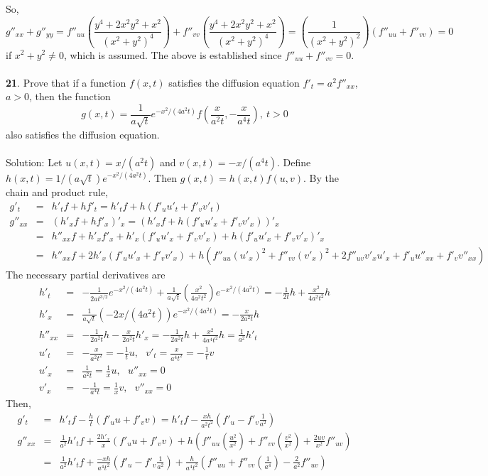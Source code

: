 \documentclass[12pt]{amsbook}
\begin{document}
So,
$$g''_{xx}+g''_{yy}=f''_{uu}(\frac{y^4+2x^2y^2+x^2}{(x^2+y^2)^4})+f''_{vv}(\frac{y^4+2x^2y^2+x^2}{(x^2+y^2)^4})=(\frac{1}{(x^2+y^2)^2})(f''_{uu}+f''_{vv})=0$$
if $x^2+y^2 \neq 0$, which is assumed. The above is established since $f''_{uu}+f''_{vv}=0$. 
\\
\\
{\small\bf 21}. Prove that if a function $f(x, t)$ satisfies the diffusion equation $f'_t=a^2f''_{xx}$,
$a > 0$, then the function
$$g(x,t)=\frac{1}{a\sqrt{t}}e^{-x^2/(4a^2t)}f(\frac{x}{a^2t},-\frac{x}{a^4t}), \ t>0$$
also satisfies the diffusion equation.
\\
\\
{\sc Solution}: Let $u(x,t)=x/(a^2t)$ and $v(x,t)=-x/(a^4t)$. Define $h(x,t)=1/(a\sqrt{t})e^{-x^2/(4a^2t)}$. Then $g(x,t)=h(x,t)f(u,v)$. By the chain and product rule,
\begin{eqnarray*}
g'_t&=&h'_tf+hf'_t=h'_tf+h(f'_uu'_t+f'_vv'_t)\\
g''_{xx}&=&(h'_xf+hf'_x)'_x=(h'_xf+h(f'_uu'_x+f'_vv'_x))'_x\\
&=&h''_{xx}f+h'_xf'_x+h'_x(f'_uu'_x+f'_vv'_x)+h(f'_uu'_x+f'_vv'_x)'_x\\
&=&h''_{xx}f+2h'_x(f'_uu'_x+f'_vv'_x)+h(f''_{uu}(u'_x)^2+f''_{vv}(v'_x)^2+2f''_{uv}v'_xu'_x+f'_uu''_{xx}+f'_vv''_{xx})
\end{eqnarray*}
The necessary partial derivatives are
\begin{eqnarray*}
h'_t&=&-\frac{1}{2at^{3/2}}e^{-x^2/(4a^2t)}+\frac{1}{a\sqrt{t}}(\frac{x^2}{4a^2t^2})e^{-x^2/(4a^2t)}=-\frac{1}{2t}h+\frac{x^2}{4a^2t^2}h\\
h'_x&=&\frac{1}{a\sqrt{t}}(-2x/(4a^2t))e^{-x^2/(4a^2t)}=-\frac{x}{2a^2t}h \\
h''_{xx}&=&-\frac{1}{2a^2t}h-\frac{x}{2a^2t}h'_x=-\frac{1}{2a^2t}h+\frac{x^2}{4a^4t^2}h=\frac{1}{a^2}h'_t \\
u'_t&=&-\frac{x}{a^2t^2}=-\frac{1}{t}u, \ \ \ v'_t=\frac{x}{a^4t^2}=-\frac{1}{t}v \\
u'_x&=&\frac{1}{a^2t}=\frac{1}{x}u, \ \ \ u''_{xx}=0\\
v'_x&=&-\frac{1}{a^4t}=\frac{1}{x}v, \ \ \ v''_{xx}=0
\end{eqnarray*}
Then,
\begin{eqnarray*}
g'_t&=&h'_tf-\frac{h}{t}(f'_uu+f'_vv)=h'_tf-\frac{xh}{a^2t^2}(f'_u-f'_v\frac{1}{a^2}) \\
g''_{xx}&=&\frac{1}{a^2}h'_tf+\frac{2h'_x}{x}(f'_uu+f'_vv)+h(f''_{uu}(\frac{u^2}{x^2})+f''_{vv}(\frac{v^2}{x^2})+\frac{2uv}{x^2}f''_{uv}) \\
&=&\frac{1}{a^2}h'_tf+\frac{-xh}{a^4t^2}(f'_u-f'_v\frac{1}{a^2})+\frac{h}{a^4t^2}(f''_{uu}+f''_{vv}(\frac{1}{a^4})-\frac{2}{a^2}f''_{uv})
\end{eqnarray*}
\end{document}
